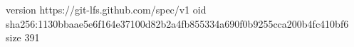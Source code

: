 version https://git-lfs.github.com/spec/v1
oid sha256:1130bbaae5e6f164e37100d82b2a4fb855334a690f0b9255cca200b4fc410bf6
size 391
